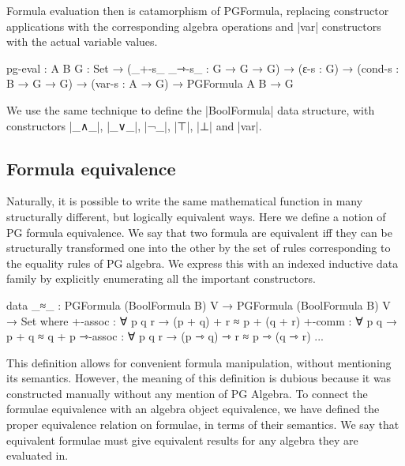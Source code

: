 
Formula evaluation then is catamorphism of PGFormula, replacing constructor applications with the corresponding algebra operations and |var| constructors with the actual variable values.
\begin{code}
pg-eval : {A B G : Set} 
   → (_+-s_ _⇾-s_ : G → G → G) 
   → (ε-s : G) 
   → (cond-s : B → G → G) 
   → (var-s : A → G) 
   → PGFormula A B 
   → G
\end{code}



We use the same technique to define the |BoolFormula| data structure, with constructors |_∧_|, |_∨_|, |¬_|, |⊤|, |⊥| and |var|.

\subsection{Formula equivalence}

Naturally, it is possible to write the same mathematical function in many structurally different, but logically equivalent ways.
Here we define a notion of PG formula equivalence. We say that two formula are equivalent iff they 
can be structurally transformed one into the other by the set of rules corresponding to the equality rules of PG algebra.
We express this with an indexed inductive data family by explicitly enumerating all the important constructors.


\begin{code}
 data _≈_ : PGFormula (BoolFormula B) V 
         → PGFormula (BoolFormula B) V → Set where
  +-assoc : ∀ p q r → (p + q) + r ≈ p + (q + r)
  +-comm : ∀ p q → p + q ≈ q + p
  ⇾-assoc : ∀ p q r → (p ⇾ q) ⇾ r ≈ p ⇾ (q ⇾ r)
  ...
\end{code}

This definition allows for convenient formula manipulation, without mentioning its semantics.
However, the meaning of this definition is dubious because it was constructed manually without any mention of PG Algebra.
To connect the formulae equivalence with an algebra object equivalence, we have defined the proper equivalence relation on formulae, 
in terms of their semantics. We say that equivalent formulae must give equivalent results for any algebra they are evaluated in.

